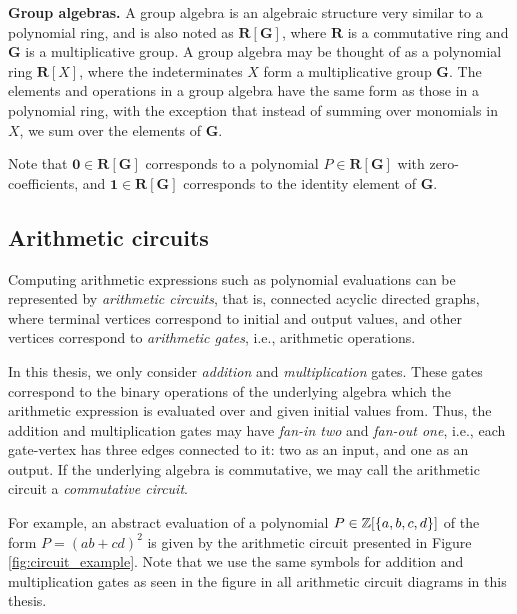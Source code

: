 \textbf{Group algebras.} A group algebra is an algebraic structure 
very similar to a polynomial ring, and 
is also noted as $\mathbf{R}[\mathbf{G}]$, where $\mathbf{R}$ is a commutative ring and 
$\mathbf{G}$ is a multiplicative group. A group algebra may be thought of as a 
polynomial ring $\mathbf{R}[X]$, where the indeterminates $X$ form a multiplicative group $\mathbf{G}$. 
The elements and operations in a group algebra have the same form as those in a polynomial ring, 
with the exception that instead of summing over monomials in $X$, 
we sum over the elements of $\mathbf{G}$.

Note that $\mathbf{0} \in \mathbf{R}[\mathbf{G}]$ corresponds to a 
polynomial $P \in \mathbf{R}[\mathbf{G}]$ with zero-coefficients, and 
$\mathbf{1} \in \mathbf{R}[\mathbf{G}]$ corresponds to the identity element of $\mathbf{G}$. 


\subsection{Arithmetic circuits}
\label{sect:prelims_circuits}

Computing arithmetic expressions such as polynomial evaluations 
can be represented by \emph{arithmetic circuits}, that is, 
connected acyclic directed graphs, where terminal vertices correspond to initial and output values, 
and other vertices correspond to \emph{arithmetic gates}, i.e., arithmetic operations. 

In this thesis, we only consider \emph{addition} and \emph{multiplication} gates. 
These gates correspond to the binary operations of the underlying algebra  
which the arithmetic expression is evaluated over and given initial values from. Thus, 
the addition and multiplication gates may have \emph{fan-in two} and \emph{fan-out one}, 
i.e., each gate-vertex has three edges connected to it: two as an input, and one as an output. 
If the underlying algebra is commutative, we may call the arithmetic circuit a \emph{commutative circuit}. 

For example, an abstract evaluation of a polynomial $P \in \mathbb Z[\{a,b,c,d\}]$ of the form 
$P = (ab+cd)^2$ is given by the arithmetic circuit presented in Figure \ref{fig:circuit_example}. 
Note that we use the same symbols for addition and multiplication gates as seen in the figure 
in all arithmetic circuit diagrams in this thesis.


